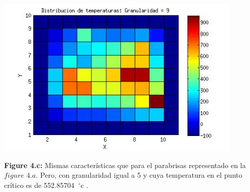 \includegraphics[width=\textwidth,height=3.0in,keepaspectratio
]{82x71h9.jpg} \newline
\begin {flushleft}
\textbf{Figure 4.c:} Mismas características que para el parabrisas representado en la $figure$ $4.a$. Pero, con granularidad igual a 5 y cuya temperatura en el punto crítico es de 552.85704\hspace{-1.5mm}$\phantom{a}^{\circ}$c .
\end{flushleft}








